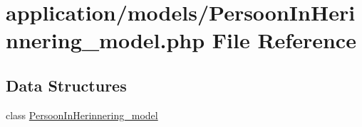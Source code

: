 \hypertarget{_persoon_in_herinnering__model_8php}{}\section{application/models/\+Persoon\+In\+Herinnering\+\_\+model.php File Reference}
\label{_persoon_in_herinnering__model_8php}
\subsection*{Data Structures}
\begin{DoxyCompactItemize}
\item 
class \mbox{\hyperlink{class_persoon_in_herinnering__model}{Persoon\+In\+Herinnering\+\_\+model}}
\end{DoxyCompactItemize}
